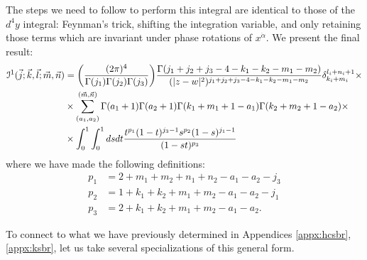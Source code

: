 \documentclass[../main.tex]{subfiles}
\begin{document}
The steps we need to follow to perform this integral are identical to those of the $d^4y$
integral: Feynman’s trick, shifting the integration variable, and only retaining those terms which are invariant under phase rotations of $x^{\dot{\alpha}}$. We present the final result:
\begingroup \allowdisplaybreaks \begin{align}
\mathcal{I}^1(\vec{j};\vec{k},\vec{l};\vec{m}, \vec{n}) &= \bigg(\frac{(2\pi)^4}{\Gamma(j_1) \Gamma(j_2) \Gamma(j_3)}\bigg) \frac{\Gamma(j_1+j_2+j_3-4-k_1-k_2-m_1-m_2)}{(\vert z-w \vert^2)^{j_1+j_2+j_3-4-k_1-k_2-m_1-m_2}} \delta_{k_i+m_i}^{l_i+n_i+1} \times \notag \\
&\times \sum_{(a_1,a_2)}^{(\vec{m},\vec{n})} \Gamma(a_1+1) \Gamma(a_2+1) \Gamma(k_1+m_1+1-a_1) \Gamma(k_2+m_2+1-a_2) \times \notag \\
&\times \int_0^1 \int_0^1 ds dt \frac{t^{p_1} (1-t)^{j_3-1} s^{p_2} (1-s)^{j_1-1}}{(1-st)^{p_3}}
\end{align} \endgroup
where we have made the following definitions:
\begingroup \allowdisplaybreaks \begin{align}
    p_1 &= 2+m_1+m_2+n_1+n_2-a_1-a_2-j_3 \\ p_2 &= 1+k_1+k_2+m_1+m_2-a_1-a_2-j_1 \\ p_3 &= 2+k_1+k_2+m_1+m_2-a_1-a_2.
\end{align} \endgroup

\newline

To connect to what we have previously determined in Appendices \ref{appx:hcsbr}, \ref{appx:ksbr}, let us take several specializations of this general form. 
\end{document}
